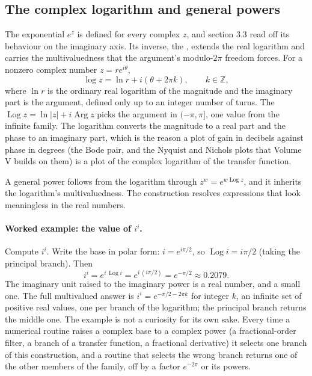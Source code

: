 \subsection{The complex logarithm and general powers}

The exponential $e^{z}$ is defined for every complex $z$, and section 3.3
read off its behaviour on the imaginary axis. Its inverse, the
, extends the real logarithm and carries the
multivaluedness that the argument's modulo-$2\pi$ freedom forces. For a
nonzero complex number $z = r e^{i\theta}$,
\[
\log z = \ln r + i(\theta + 2\pi k), \qquad k \in \mathbb{Z},
\]
where $\ln r$ is the ordinary real logarithm of the magnitude and the
imaginary part is the argument, defined only up to an integer number of
turns. The  $\operatorname{Log} z = \ln|z| + i\operatorname{Arg} z$ picks
the argument in $(-\pi, \pi]$, one value from the infinite family. The
logarithm converts the magnitude to a real part and the phase to an
imaginary part, which is the reason a plot of gain in decibels against
phase in degrees (the Bode pair, and the Nyquist and Nichols plots that
Volume V builds on them) is a plot of the complex logarithm of the transfer
function.

A general power follows from the logarithm through $z^{w} = e^{w\operatorname{Log} z}$,
and it inherits the logarithm's multivaluedness. The construction resolves
expressions that look meaningless in the real numbers.

\paragraph{Worked example: the value of $i^{i}$.} Compute $i^{i}$. Write the
base in polar form: $i = e^{i\pi/2}$, so $\operatorname{Log} i = i\pi/2$ (taking the
principal branch). Then
\[
i^{i} = e^{i\,\operatorname{Log} i} = e^{i\,(i\pi/2)} = e^{-\pi/2} \approx 0.2079.
\]
The imaginary unit raised to the imaginary power is a real number, and a
small one. The full multivalued answer is $i^{i} = e^{-\pi/2 - 2\pi k}$ for
integer $k$, an infinite set of positive real values, one per branch of the
logarithm; the principal branch returns the middle one. The example is not a
curiosity for its own sake. Every time a numerical routine raises a complex
base to a complex power (a fractional-order filter, a branch of a transfer
function, a fractional derivative) it selects one branch of this construction,
and a routine that selects the wrong branch returns one of the other members
of the family, off by a factor $e^{-2\pi}$ or its powers.

